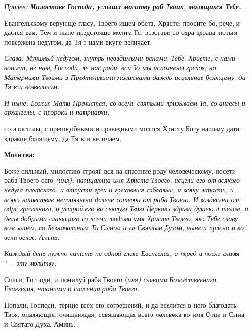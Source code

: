 \itshape Припев: \normalfont{}\bfseries Милостиве Господи, услыши молитву раб Твоих, молящихся Тебе.

\normalfont{}Евангельскому верующе гласу, Твоего ищем обета, Христе: просите бо, рече, и дастся вам. Тем и ныне предстояще молим Тя, возстави со одра здрава лютым повержена недугом, да Тя с нами вкупе величает.

\itshape Слава: \normalfont{}Мучимый недугом, внутрь невидимыми ранами, Тебе, Христе, с нами вопиет, не нам, Господи, не нас ради, вси бо мы исполнены грехов, но Матерними Твоими и Предтечевыми молитвами даждь исцеление болящему, да Тя вси возвеличим.

\itshape И ныне: \normalfont{}Божия Мати Пречистая, со всеми святыми призываем Тя, со ангелы и архангелы, с пророки и патриархи,

со апостолы, с преподобными и праведными молися Христу Богу нашему дати здравие болящему, да Тя вси величаем.


\medskip


\bfseries Молитва:\normalfont{}


Боже сильный, милостию строяй вся на спасение роду человеческому, посети раба Твоего сего \itshape (имя), \normalfont{}нарицающа имя Христа Твоего, исцели его от всякого недуга плотскаго: и отпусти грех и греховныя соблазны, и всяку напасть, и всяко нашествие неприязнено далече сотвори от раба Твоего. И воздвигни от одра греховнаго, и устрой его во святую Твою Церковь здрава душею и телом, и делы добрыми славящаго со всеми людьми имя Христа Твоего, яко Тебе славу возсылаем, со Безначальным Ти Сыном и со Святым Духом, ныне и присно и во веки веков. Аминь.


\mychapterending

 


\itshape Каждый день нужно читать по одной главе Евангелия, а перед и после главы "--- эту молитву:\normalfont{}




Спаси, Господи, и помилуй раба Твоего (\itshape имя\normalfont{}) словами Божественнаго Евангелия, чтомыми о спасении раба Твоего. 

Попали, Господи, терние всех его согрешений, и да вселится в него благодать Твоя, опаляющая, очищающая, освящающая всего человека во имя Отца и Сына и Святаго Духа. Аминь.





